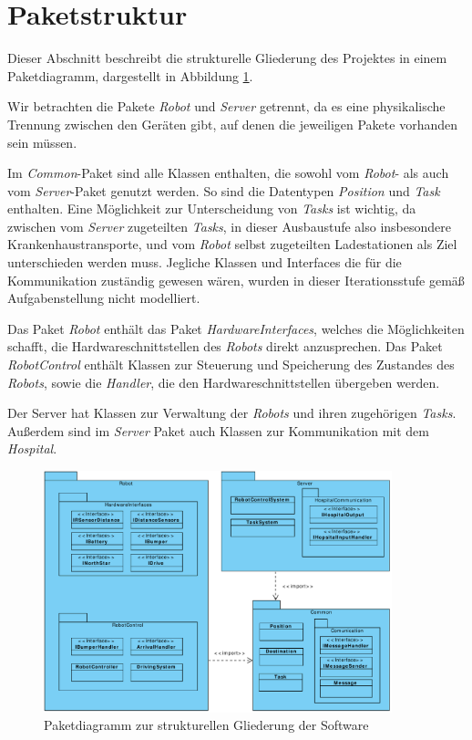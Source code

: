 \section{Paketstruktur}
Dieser Abschnitt beschreibt die strukturelle Gliederung des Projektes in einem Paketdiagramm, dargestellt in Abbildung \ref{Paketstruktur}.

Wir betrachten die Pakete \textit{Robot} und \textit{Server} getrennt, da es eine physikalische Trennung zwischen den Geräten gibt, auf denen die jeweiligen Pakete vorhanden sein müssen.

Im \textit{Common}-Paket sind alle Klassen enthalten, die sowohl vom \textit{Robot}- als auch vom \textit{Server}-Paket genutzt werden. So sind die Datentypen \textit{Position} und \textit{Task} enthalten. Eine Möglichkeit zur Unterscheidung von \textit{Tasks} ist wichtig, da zwischen vom \textit{Server} zugeteilten \textit{Tasks}, in dieser Ausbaustufe also insbesondere Krankenhaustransporte, und vom \textit{Robot} selbst zugeteilten Ladestationen als Ziel unterschieden werden muss. Jegliche Klassen und Interfaces die für die Kommunikation zuständig gewesen wären, wurden in dieser Iterationsstufe gemäß Aufgabenstellung nicht modelliert.

Das Paket \textit{Robot} enthält das Paket \textit{HardwareInterfaces}, welches die Möglichkeiten schafft, die Hardwareschnittstellen des \textit{Robots} direkt anzusprechen. Das Paket \textit{RobotControl} enthält Klassen zur Steuerung und Speicherung des Zustandes des \textit{Robots}, sowie die \emph{Handler}, die den Hardwareschnittstellen übergeben werden.

Der Server hat Klassen zur Verwaltung der \textit{Robots} und ihren zugehörigen \textit{Tasks}. Außerdem sind im \textit{Server} Paket auch Klassen zur Kommunikation mit dem \textit{Hospital}.

\begin{figure}[H]
\centering
\includegraphics[width=0.9\textwidth]{img/6_paketdiagramm}
\caption{Paketdiagramm zur strukturellen Gliederung der Software}
\label{Paketstruktur}
\end{figure}
